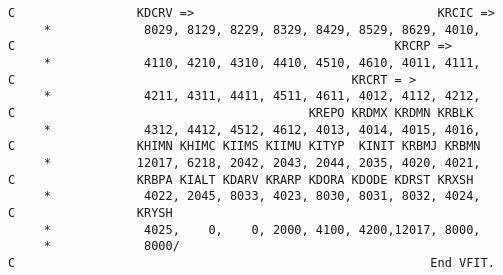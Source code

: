 \begin{verbatim}
C                 KDCRV =>                                  KRCIC =>
     *             8029, 8129, 8229, 8329, 8429, 8529, 8629, 4010,
C                                                     KRCRP =>
     *             4110, 4210, 4310, 4410, 4510, 4610, 4011, 4111,
C                                               KRCRT = >
     *             4211, 4311, 4411, 4511, 4611, 4012, 4112, 4212,
C                                         KREPO KRDMX KRDMN KRBLK
     *             4312, 4412, 4512, 4612, 4013, 4014, 4015, 4016,
C                 KHIMN KHIMC KIIMS KIIMU KITYP  KINIT KRBMJ KRBMN
     *            12017, 6218, 2042, 2043, 2044, 2035, 4020, 4021,
C                 KRBPA KIALT KDARV KRARP KDORA KDODE KDRST KRXSH
     *             4022, 2045, 8033, 4023, 8030, 8031, 8032, 4024,
C                 KRYSH
     *             4025,    0,    0, 2000, 4100, 4200,12017, 8000,
     *             8000/
C                                                          End VFIT.

\end{verbatim}

